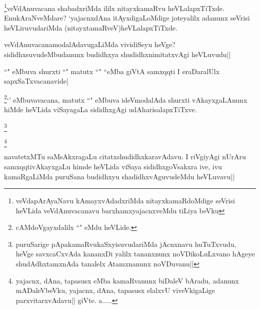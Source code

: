\begin{artha}
\footnote{veVdapArAyaNavu kAmayxvAdadxriMda nitayxkamaRdoMdige seVrisi heVLida 
veVdAnuvacanavu barxhamxyajacnxveMdu tiLiya beVku}veVdAnuvacana shabadxriMda ililx 
nitayxkamaRvu heVLalapxTiTxde. EnukAraNveMdare? 
`yajacnxdAna itAyxdigaLoMdige joteyalilx adanunx seVrisi heVLiruvudariMda 
(nitayxtamaRveV)heVLalapxTiTxde.
\end{artha}

\begin{artha}
veVdAnuvacanamodalAdavugaLiMda vividiSeyu heVge? sididhxsuvudeMbudanunx budidhxya shudidhxnimitatxvAgi heVLuvudu||
\end{artha}


\begin{artha}
``\stext" eMbuva shurxti ``\stext" matutx ``\stext" ``\stext eMba giVtA samxqqti I eraDaralUlx sapxSaTxvacanavide|
\end{artha}


\begin{artha}
\footnotemark\footnote{cAMdoVgayxdalilx ``\stext" eMdu heVLide.}`\stext' eMbuvavacana, matutx ``\stext" eMbuva ideVmodalAda shurxti vAkayxgaLAnunx hiMde heVLida viSayagaLa sididhxgAgi udAharisalapxTiTxve.
\end{artha}


\begin{artha}
\footnote{puruSarige pApakamaRvukaSxyisuvudariMda jAcnxnavu huTuTxvudu, heVge savxcaCxvAda kananxDi yalilx tananxnunx noVDikoLuLxvano hAgeye shudAdhxtamxnAda  tanalelx Atamxnanunx noVDuvanu||}
\end{artha}

\begin{artha}
\footnote{yajacnx, dAna, tapasusx eMba kamaRvanunx biDaleV bAradu, adanunx mADaleVbeVku, yajacnx, dAna, tapasusx elalxvU viveVkigaLige parxvitarxvAdavu|| giVte. a.....}
\end{artha}

\begin{artha}
navatetxMTu saMsAkxragaLu citatxshudidhxkaravAdavu. I riVgiyAgi nUrAru samxqqtivAkayxgaLu himde heVLida viSaya sididhxgoVsakxra ive, ivu kamaRgaLiMda puruSana budidhxyu shadidhxvAguvudeMdu heVLuvavu||
\end{artha}

